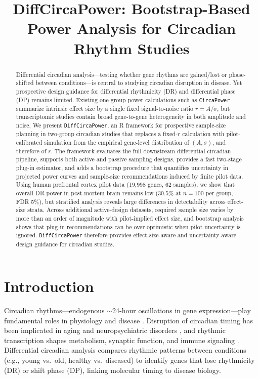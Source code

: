 \documentclass{article}
\title{DiffCircaPower: Bootstrap-Based Power Analysis for Circadian Rhythm Studies}
\author{}
\date{}
\newcommand{\software}[1]{\texttt{#1}}
\begin{document}
\maketitle

\begin{abstract}
Differential circadian analysis---testing whether gene rhythms are gained/lost or phase-shifted between conditions---is central to studying circadian disruption in disease. Yet prospective design guidance for differential rhythmicity (DR) and differential phase (DP) remains limited. Existing one-group power calculations such as \software{CircaPower} summarize intrinsic effect size by a single fixed signal-to-noise ratio $r=A/\sigma$, but transcriptomic studies contain broad gene-to-gene heterogeneity in both amplitude and noise. We present \software{DiffCircaPower}, an R framework for prospective sample-size planning in two-group circadian studies that replaces a fixed-$r$ calculation with pilot-calibrated simulation from the empirical gene-level distribution of $(A,\sigma)$, and therefore of $r$. The framework evaluates the full downstream differential circadian pipeline, supports both active and passive sampling designs, provides a fast two-stage plug-in estimator, and adds a bootstrap procedure that quantifies uncertainty in projected power curves and sample-size recommendations induced by finite pilot data. Using human prefrontal cortex pilot data (19,998 genes, 62 samples), we show that overall DR power in post-mortem brain remains low (30.5\% at $n=100$ per group, FDR 5\%), but stratified analysis reveals large differences in detectability across effect-size strata. Across additional active-design datasets, required sample size varies by more than an order of magnitude with pilot-implied effect size, and bootstrap analysis shows that plug-in recommendations can be over-optimistic when pilot uncertainty is ignored. \software{DiffCircaPower} therefore provides effect-size-aware and uncertainty-aware design guidance for circadian studies.
\end{abstract}

\section{Introduction}

Circadian rhythms---endogenous $\sim$24-hour oscillations in gene expression---play fundamental roles in physiology and disease \cite{takahashi2017transcriptional}. Disruption of circadian timing has been implicated in aging and neuropsychiatric disorders \cite{chen2016aging}, and rhythmic transcription shapes metabolism, synaptic function, and immune signaling \cite{takahashi2017transcriptional,mure2018diurnal,chen2016aging}. Differential circadian analysis compares rhythmic patterns between conditions (e.g., young vs.\ old, healthy vs.\ diseased) to identify genes that lose rhythmicity (DR) or shift phase (DP), linking molecular timing to disease biology.
\end{document}
